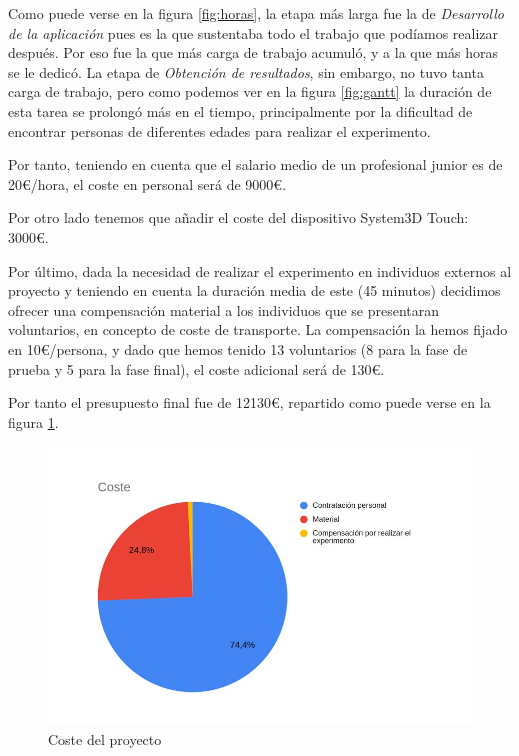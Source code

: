 \documentclass[a4paper,11pt, oneside]{book}
\begin{document}
Como puede verse en la figura \ref{fig:horas}, la etapa más larga fue la de \textit{Desarrollo de la aplicación} pues es la que sustentaba todo el trabajo que podíamos realizar después. Por eso fue la que más carga de trabajo acumuló, y a la que más horas se le dedicó. La etapa de \textit{Obtención de resultados}, sin embargo, no tuvo tanta carga de trabajo, pero como podemos ver en la figura \ref{fig:gantt} la duración de esta tarea se prolongó más en el tiempo, principalmente por la dificultad de encontrar personas de diferentes edades para realizar el experimento.


Por tanto, teniendo en cuenta que el salario medio de un profesional junior es de 20\euro /hora, el coste en personal será de 9000\euro.

Por otro lado tenemos que añadir el coste del dispositivo System3D Touch: 3000\euro.

Por último, dada la necesidad de realizar el experimento en individuos externos al proyecto y teniendo en cuenta la duración media de este (45 minutos) decidimos ofrecer una compensación material a los individuos que se presentaran voluntarios, en concepto de coste de transporte. La compensación la hemos fijado en 10\euro /persona, y dado que hemos tenido 13 voluntarios (8 para la fase de prueba y 5 para la fase final), el coste adicional será de 130\euro.

Por tanto el presupuesto final fue de 12130\euro, repartido como puede verse en la figura \ref{fig:coste}.

\begin{figure}[H]
	
	\centering
	\includegraphics[width=\linewidth]{coste}
	\caption{Coste del proyecto}
	\label{fig:coste}
	
\end{figure}
\end{document}
